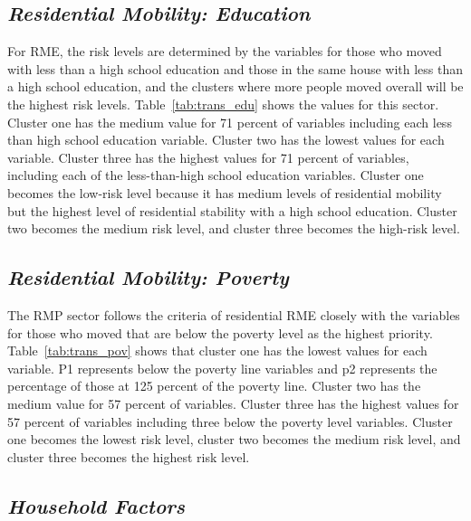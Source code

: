 

\subsection{\textit{Residential Mobility: Education}}

For RME, the risk levels are determined by the variables for those who moved with less than a high school education and those in the same house with less than a high school education, and the clusters where more people moved overall will be the highest risk levels. Table~\ref{tab:trans_edu} shows the values for this sector. Cluster one has the medium value for 71 percent of variables including each less than high school education variable. Cluster two has the lowest values for each variable. Cluster three has the highest values for 71 percent of variables, including each of the less-than-high school education variables. Cluster one becomes the low-risk level because it has medium levels of residential mobility but the highest level of residential stability with a high school education. Cluster two becomes the medium risk level, and cluster three becomes the high-risk level. 




\subsection{\textit{Residential Mobility: Poverty}}

The RMP sector follows the criteria of residential RME closely with the variables for those who moved that are below the poverty level as the highest priority. Table~\ref{tab:trans_pov} shows that cluster one has the lowest values for each variable. P1 represents below the poverty line variables and p2 represents the percentage of those at 125 percent of the poverty line. Cluster two has the medium value for 57 percent of variables. Cluster three has the highest values for 57 percent of variables including three below the poverty level variables. Cluster one becomes the lowest risk level, cluster two becomes the medium risk level, and cluster three becomes the highest risk level. 



\subsection{\textit{Household Factors}}

